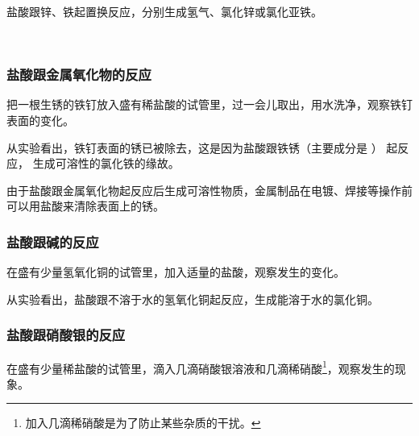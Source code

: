 盐酸跟锌、铁起置换反应，分别生成氢气、氯化锌或氯化亚铁。
\begin{fangchengshi}
     \\
\end{fangchengshi}


\subsubsection{盐酸跟金属氧化物的反应}

\begin{shiyan}
    把一根生锈的铁钉放入盛有稀盐酸的试管里，过一会儿取出，用水洗净，观察铁钉表面的变化。
\end{shiyan}

从实验看出，铁钉表面的锈已被除去，这是因为盐酸跟铁锈（主要成分是  ） 起反应，
生成可溶性的氯化铁的缘故。
\begin{fangchengshi}
\end{fangchengshi}

由于盐酸跟金属氧化物起反应后生成可溶性物质，金属制品在电镀、焊接等操作前可以用盐酸来清除表面上的锈。


\subsubsection{盐酸跟碱的反应}

\begin{shiyan}
    在盛有少量氢氧化铜的试管里，加入适量的盐酸，观察发生的变化。
\end{shiyan}

从实验看出，盐酸跟不溶于水的氢氧化铜起反应，生成能溶于水的氯化铜。
\begin{fangchengshi}
\end{fangchengshi}



\subsubsection{盐酸跟硝酸银的反应}

\begin{shiyan}
    在盛有少量稀盐酸的试管里，滴入几滴硝酸银溶液和几滴稀硝酸\footnote{加入几滴稀硝酸是为了防止某些杂质的干扰。}，观察发生的现象。
\end{shiyan}


